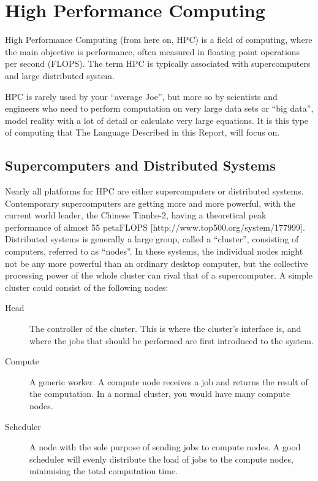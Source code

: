 \section{High Performance Computing}

High Performance Computing (from here on, HPC) is a field of computing, where the main objective is performance, often measured in floating point operations per second (FLOPS). The term HPC is typically associated with supercomputers and large distributed system. 

HPC is rarely used by your \enquote{average Joe}, but more so by scientists and engineers who need to perform computation on very large data sets or \enquote{big data}, model reality with a lot of detail or calculate very large equations. It is this type of computing that The Language Described in this Report, will focus on.


\subsection{Supercomputers and Distributed Systems}

Nearly all platforms for HPC are either supercomputers or distributed systems. Contemporary supercomputers are getting more and more powerful, with the current world leader, the Chinese Tianhe-2, having a theoretical peak performance of almost 55 petaFLOPS [http://www.top500.org/system/177999].
Distributed systems is generally a large group, called a \enquote{cluster}, consisting of computers, referred to as \enquote{nodes}. In these systems, the individual nodes might not be any more powerful than an ordinary desktop computer, but the collective processing power of the whole cluster can rival that of a supercomputer.
A simple cluster could consist of the following nodes:
\begin{description}
	\item [Head]
	The controller of the cluster. This is where the cluster's interface is, and where the jobs that should be performed are first introduced to the system.
	\item [Compute]
	A generic worker. A compute node receives a job and returns the result of the computation. In a normal cluster, you would have many compute nodes.
	\item [Scheduler]
	A node with the sole purpose of sending jobs to compute nodes. A good scheduler will evenly distribute the load of jobs to the compute nodes, minimising the total computation time.
\end{description}

